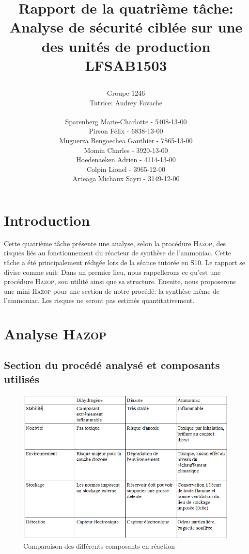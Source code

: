 \documentclass{article}
\author{Groupe 1246 \\ Tutrice: Audrey Favache \\ \\
Sparenberg Marie-Charlotte - 5408-13-00\\
Pirson Félix - 6838-13-00\\
Muguerza Bengoechea Gauthier - 7865-13-00\\
Momin Charles - 3920-13-00\\
Hoedenaeken Adrien - 4114-13-00\\
Colpin Lionel - 3965-12-00 \\
Arteaga Michaux Sayri - 3149-12-00\\ }
\title{\vspace{\fill}\begin{LARGE} \begin{bf}
Rapport de la quatrième tâche: Analyse de sécurité ciblée sur une des unités de production\\
LFSAB1503 \\
\end{bf}\end{LARGE}
\vspace{\fill}}
\begin{document}
\maketitle
\newpage
\tableofcontents
\newpage
\newpage
\section{Introduction}

	Cette quatrième tâche présente une analyse, selon la procédure \textsc{Hazop}, des risques liés au fonctionnement du réacteur de
synthèse de l’ammoniac. Cette tâche a été principalement rédigée lors de la séance tutorée en S10. Le rapport se divise comme suit:
Dans un premier lieu, nous rappellerons ce qu'est une procédure \textsc{Hazop}, son utilité ainsi que sa structure. Ensuite, nous proposerons une mini-\textsc{Hazop} pour une section de notre procédé: la synthèse même de l'ammoniac. Les risques ne seront pas estimés quantitativement.

\section{Analyse \textsc{Hazop}}

\subsection{Section du procédé analysé et composants utilisés}
\begin{figure}[ht!]
 \centering
 \includegraphics[scale=0.5]{TabComp.PNG}
 \caption{Comparaison des différents composants en réaction}
 \label{TabComp}
\end{figure}
\end{document}
